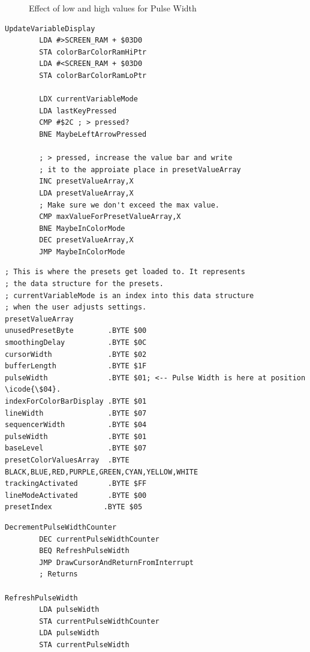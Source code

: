 \begin{figure}[H]
\begin{adjustbox}{width=10.5cm,margin=0cm -2cm}
    \end{adjustbox}
    \caption{Effect of low and high values for Pulse Width}
\end{figure}


\begin{lstlisting}[caption=From \icode{CheckKeyboardInputForActiveVariable}. Pressing the < and > keys increments and
decrements the value in presetValueArray pointed to by \icode{X}\, i.e. \icode{currentVariableMode}.]
UpdateVariableDisplay   
        LDA #>SCREEN_RAM + $03D0
        STA colorBarColorRamHiPtr
        LDA #<SCREEN_RAM + $03D0
        STA colorBarColorRamLoPtr

        LDX currentVariableMode
        LDA lastKeyPressed
        CMP #$2C ; > pressed?
        BNE MaybeLeftArrowPressed

        ; > pressed, increase the value bar and write
        ; it to the approiate place in presetValueArray
        INC presetValueArray,X
        LDA presetValueArray,X
        ; Make sure we don't exceed the max value.
        CMP maxValueForPresetValueArray,X
        BNE MaybeInColorMode
        DEC presetValueArray,X
        JMP MaybeInColorMode
\end{lstlisting}

\begin{lstlisting}[caption=From \icode{ActivateSequencer}.]
; This is where the presets get loaded to. It represents
; the data structure for the presets.
; currentVariableMode is an index into this data structure
; when the user adjusts settings.
presetValueArray
unusedPresetByte        .BYTE $00
smoothingDelay          .BYTE $0C
cursorWidth             .BYTE $02
bufferLength            .BYTE $1F
pulseWidth              .BYTE $01; <-- Pulse Width is here at position \icode{\$04}.
indexForColorBarDisplay .BYTE $01
lineWidth               .BYTE $07
sequencerWidth          .BYTE $04 
pulseWidth              .BYTE $01
baseLevel               .BYTE $07
presetColorValuesArray  .BYTE BLACK,BLUE,RED,PURPLE,GREEN,CYAN,YELLOW,WHITE
trackingActivated       .BYTE $FF
lineModeActivated       .BYTE $00
presetIndex            .BYTE $05
\end{lstlisting}


\begin{lstlisting}[caption=From \icode{MainInterruptHandler}.]
DecrementPulseWidthCounter   
        DEC currentPulseWidthCounter
        BEQ RefreshPulseWidth
        JMP DrawCursorAndReturnFromInterrupt
        ; Returns

RefreshPulseWidth   
        LDA pulseWidth
        STA currentPulseWidthCounter
        LDA pulseWidth
        STA currentPulseWidth
\end{lstlisting}
